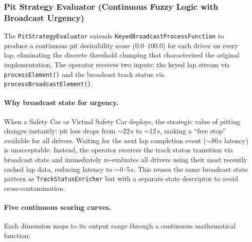 \documentclass[a4paper,twocolumn]{article}
\begin{document}
\subsubsection{Pit Strategy Evaluator (Continuous Fuzzy Logic with
Broadcast Urgency)}

The \texttt{PitStrategyEvaluator} extends
\texttt{KeyedBroadcastProcessFunction} to produce a continuous
pit desirability score ($0.0$--$100.0$) for each driver on every lap,
eliminating the discrete threshold clumping that characterized the
original implementation. The operator receives two inputs: the keyed
lap stream via \texttt{processElement()} and the broadcast track status
via \texttt{processBroadcastElement()}.

\paragraph{Why broadcast state for urgency.}
When a Safety Car or Virtual Safety Car deploys, the strategic value of
pitting changes instantly: pit loss drops from $\sim$22\,s to
$\sim$12\,s, making a ``free stop'' available for all drivers. Waiting
for the next lap completion event ($\sim$80\,s latency) is
unacceptable. Instead, the operator receives the track status transition
via broadcast state and immediately re-evaluates all drivers using their
most recently cached lap data, reducing latency to $\sim$0--5\,s. This
reuses the same broadcast state pattern as
\texttt{TrackStatusEnricher} but with a separate state descriptor to
avoid cross-contamination.

\paragraph{Five continuous scoring curves.}
Each dimension maps to its output range through a continuous
mathematical function:
\end{document}
